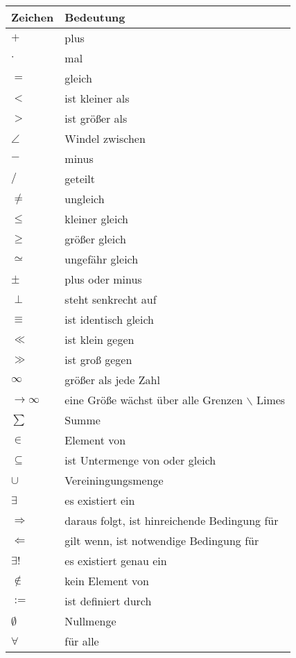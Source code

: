 \documentclass[11pt]{article}
\DeclareMathOperator{\Forall}{\forall}
\begin{document}
\begin{center}
\begin{tabular}{ll}
Zeichen & Bedeutung\\
\hline
$+$ & plus\\
$\cdot$ & mal\\
$=$ & gleich\\
$<$ & ist kleiner als\\
$>$ & ist größer als\\
$\angle$ & Windel zwischen\\
$-$ & minus\\
$/$ & geteilt\\
$\neq$ & ungleich\\
$\leq$ & kleiner gleich\\
$\geq$ & größer gleich\\
$\simeq$ & ungefähr gleich\\
$\pm$ & plus oder minus\\
$\perp$ & steht senkrecht auf\\
$\equiv$ & ist identisch gleich\\
$\ll$ & ist klein gegen\\
$\gg$ & ist groß gegen\\
$\infty$ & größer als jede Zahl\\
$\to \infty$ & eine Größe wächst über alle Grenzen $\backslash$ Limes\\
$\sum$ & Summe\\
$\in$ & Element von\\
$\subseteq$ & ist Untermenge von oder gleich\\
$\cup$ & Vereiningungsmenge\\
$\exists$ & es existiert ein\\
$\Rightarrow$ & daraus folgt, ist hinreichende Bedingung für\\
$\Leftarrow$ & gilt wenn, ist notwendige Bedingung für\\
$\exists!$ & es existiert genau ein\\
$\notin$ & kein Element von\\
$:=$ & ist definiert durch\\
$\emptyset$ & Nullmenge\\
$\Forall$ & für alle\\
\end{tabular}
\end{center}
\end{document}
